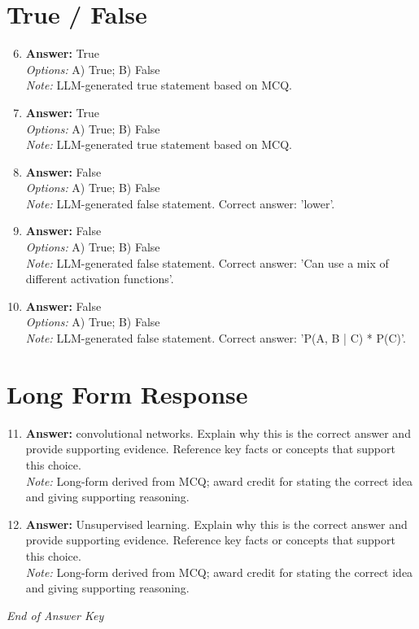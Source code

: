 \documentclass[12pt]{article}
\begin{document}
\section*{True / False}
\begin{enumerate}[label=\arabic*.]
\setcounter{enumi}{5}
\item \textbf{Answer:} True
\\ \textit{Options:} A) True; B) False
\\ \textit{Note:} LLM-generated true statement based on MCQ.
\item \textbf{Answer:} True
\\ \textit{Options:} A) True; B) False
\\ \textit{Note:} LLM-generated true statement based on MCQ.
\item \textbf{Answer:} False
\\ \textit{Options:} A) True; B) False
\\ \textit{Note:} LLM-generated false statement. Correct answer: 'lower'.
\item \textbf{Answer:} False
\\ \textit{Options:} A) True; B) False
\\ \textit{Note:} LLM-generated false statement. Correct answer: 'Can use a mix of different activation functions'.
\item \textbf{Answer:} False
\\ \textit{Options:} A) True; B) False
\\ \textit{Note:} LLM-generated false statement. Correct answer: 'P(A, B | C) * P(C)'.
\end{enumerate}

\section*{Long Form Response}
\begin{enumerate}[label=\arabic*.]
\setcounter{enumi}{10}
\item \textbf{Answer:} convolutional networks. Explain why this is the correct answer and provide supporting evidence. Reference key facts or concepts that support this choice.
\\ \textit{Note:} Long-form derived from MCQ; award credit for stating the correct idea and giving supporting reasoning.
\item \textbf{Answer:} Unsupervised learning. Explain why this is the correct answer and provide supporting evidence. Reference key facts or concepts that support this choice.
\\ \textit{Note:} Long-form derived from MCQ; award credit for stating the correct idea and giving supporting reasoning.
\end{enumerate}

\vfill
\noindent\textit{End of Answer Key}
\end{document}
